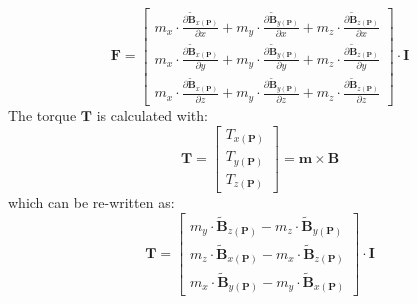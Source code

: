 \begin{equation}
\boldsymbol{F}=\begin{bmatrix}
m_x\cdot\frac{{\partial {\mathbf{\widetilde{B}}}_{x(\mathbf{P})}}}{\partial x}+m_y\cdot\frac{{\partial {\mathbf{\widetilde{B}}}_{y(\mathbf{P})}}}{\partial x}+m_z\cdot\frac{{\partial {\mathbf{\widetilde{B}}}_{z(\mathbf{P})}}}{\partial x}
\\ 
m_x\cdot\frac{{\partial {\mathbf{\widetilde{B}}}_{x(\mathbf{P})}}}{\partial y}+m_y\cdot\frac{{\partial {\mathbf{\widetilde{B}}}_{y(\mathbf{P})}}}{\partial y}+m_z\cdot\frac{{\partial {\mathbf{\widetilde{B}}}_{z(\mathbf{P})}}}{\partial y}
\\ 
m_x\cdot\frac{{\partial {\mathbf{\widetilde{B}}}_{x(\mathbf{P})}}}{\partial z}+m_y\cdot\frac{{\partial {\mathbf{\widetilde{B}}}_{y(\mathbf{P})}}}{\partial z}+m_z\cdot\frac{{\partial {\mathbf{\widetilde{B}}}_{z(\mathbf{P})}}}{\partial z}
\end{bmatrix}\cdot\mathbf{I}
\end{equation}
%
The torque $\mathbf{T}$ is calculated with:
%
\begin{equation}
\mathbf{T}=\begin{bmatrix}
T_{x(\mathbf{P})}
\\ 
T_{y(\mathbf{P})}
\\ 
T_{z(\mathbf{P})}
\end{bmatrix}
=\mathbf{m}\times\mathbf{B}
\label{Torque}
\end{equation}
%
which can be re-written as:
%
\begin{equation}
\mathbf{T}=\begin{bmatrix}
m_y\cdot \mathbf{\widetilde{B}}_{z(\mathbf{P})}-m_z\cdot \mathbf{\widetilde{B}}_{y(\mathbf{P})}
\\
m_z\cdot \mathbf{\widetilde{B}}_{x(\mathbf{P})}-m_x\cdot \mathbf{\widetilde{B}}_{z(\mathbf{P})}
\\ 
m_x\cdot \mathbf{\widetilde{B}}_{y(\mathbf{P})}-m_y\cdot \mathbf{\widetilde{B}}_{x(\mathbf{P})}
\end{bmatrix}\cdot \mathbf{I}
\label{TorqueMatrix}
\end{equation}


